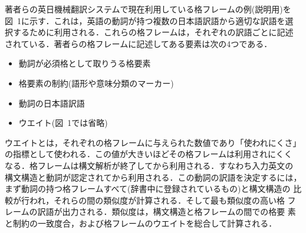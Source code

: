 著者らの英日機械翻訳システムで現在利用している格フレームの例(説明用)を
図~1に示す．これは，英語の動詞が持つ複数の日本語訳語から適切な訳語を選
択するために利用される．これらの格フレームは，それぞれの訳語ごとに記述
されている．著者らの格フレームに記述してある要素は次の4つである．
\begin{itemize}
\item 動詞が必須格として取りうる格要素
\item 格要素の制約(語形や意味分類のマーカー)
\item 動詞の日本語訳語
\item ウエイト(図~1では省略)
\end{itemize}
ウエイトとは，それぞれの格フレームに与えられた数値であり「使われにくさ」
の指標として使われる．この値が大きいほどその格フレームは利用されにくく
なる．格フレームは構文解析が終了してから利用される．すなわち入力英文の
構文構造と動詞が認定されてから利用される．この動詞の訳語を決定するには，
まず動詞の持つ格フレームすべて(辞書中に登録されているもの)と構文構造の
比較が行われ，それらの間の類似度が計算される．そして最も類似度の高い格
フレームの訳語が出力される．類似度は，構文構造と格フレームの間での格要
素と制約の一致度合，および格フレームのウエイトを総合して計算される．


